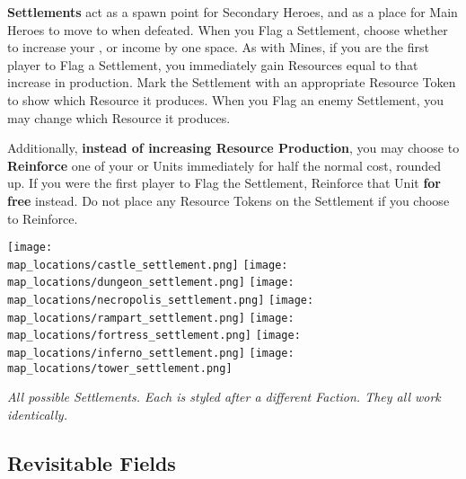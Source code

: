 \begin{multicols*}{2}
\textbf{Settlements} act as a spawn point for Secondary Heroes, and as a place for Main Heroes to move to when defeated.
When you Flag a Settlement, choose whether to increase your ,  or  income by one space.
As with Mines, if you are the first player to Flag a Settlement, you immediately gain Resources equal to that increase in production.
Mark the Settlement with an appropriate Resource Token to show which Resource it produces.
When you Flag an enemy Settlement, you may change which Resource it produces.\par
Additionally, \textbf{instead of increasing Resource Production}, you may choose to \textbf{Reinforce} one of your  or  Units immediately for half the normal cost, rounded up.
If you were the first player to Flag the Settlement, Reinforce that Unit \textbf{for free} instead.
Do not place any Resource Tokens on the Settlement if you choose to Reinforce.

\bigbreak

\begin{minipage}[h]{\linewidth}
  \centering
  \texttt{[image: \\map\_locations/castle\_settlement.png]}
  \texttt{[image: \\map\_locations/dungeon\_settlement.png]}
  \texttt{[image: \\map\_locations/necropolis\_settlement.png]}
  \texttt{[image: \\map\_locations/rampart\_settlement.png]}
  \texttt{[image: \\map\_locations/fortress\_settlement.png]}
  \texttt{[image: \\map\_locations/inferno\_settlement.png]}
  \texttt{[image: \\map\_locations/tower\_settlement.png]}
  \par
  \textit{All possible Settlements.
  Each is styled after a different Faction.
  They all work identically.}
\end{minipage}
\end{multicols*}
\bigbreak

\subsection*{\hypertarget{Revisitable}{Revisitable Fields}}

